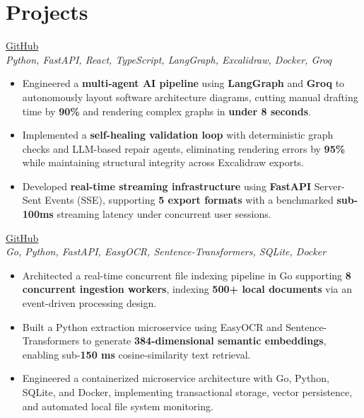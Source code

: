 \documentclass[a4paper,10pt]{article}
\begin{document}
\section*{Projects}
\begin{description}[leftmargin=!,labelwidth=0.5cm]

   \item[\textbf{ArchiGen AI (Multi-Agent Excalidraw Diagram Generator)}] \hfill \href{https://github.com/Atharv-3105/ArchiGen_AI}{GitHub} \\
    \textit{Python, FastAPI, React, TypeScript, LangGraph, Excalidraw, Docker, Groq}

    \begin{itemize}
        \item Engineered a \textbf{multi-agent AI pipeline} using \textbf{LangGraph} and \textbf{Groq} to autonomously layout software architecture diagrams, cutting manual drafting time by \textbf{90\%} and rendering complex graphs in \textbf{under 8 seconds}.
        \item Implemented a \textbf{self-healing validation loop} with deterministic graph checks and LLM-based repair agents, eliminating rendering errors by \textbf{95\%} while maintaining structural integrity across Excalidraw exports.
        \item Developed \textbf{real-time streaming infrastructure} using \textbf{FastAPI} Server-Sent Events (SSE), supporting \textbf{5 export formats} with a benchmarked \textbf{sub-100ms} streaming latency under concurrent user sessions.
    \end{itemize}

    \item[\textbf{AI-Enhanced Semantic File-Manager}] \hfill \href{https://github.com/Atharv-3105/SmartFile-Manager}{GitHub} \\
    \textit{Go, Python, FastAPI, EasyOCR, Sentence-Transformers, SQLite, Docker}

    \begin{itemize}
        \item Architected a real-time concurrent file indexing pipeline in Go supporting \textbf{8 concurrent ingestion workers}, indexing \textbf{500+ local documents} via an event-driven processing design.
        \item Built a Python extraction microservice using EasyOCR and Sentence-Transformers to generate \textbf{384-dimensional semantic embeddings}, enabling sub-\textbf{150 ms} cosine-similarity text retrieval.
        \item Engineered a containerized microservice architecture with Go, Python, SQLite, and Docker, implementing transactional storage, vector persistence, and automated local file system monitoring.
    \end{itemize}


\end{description}
\end{document}
